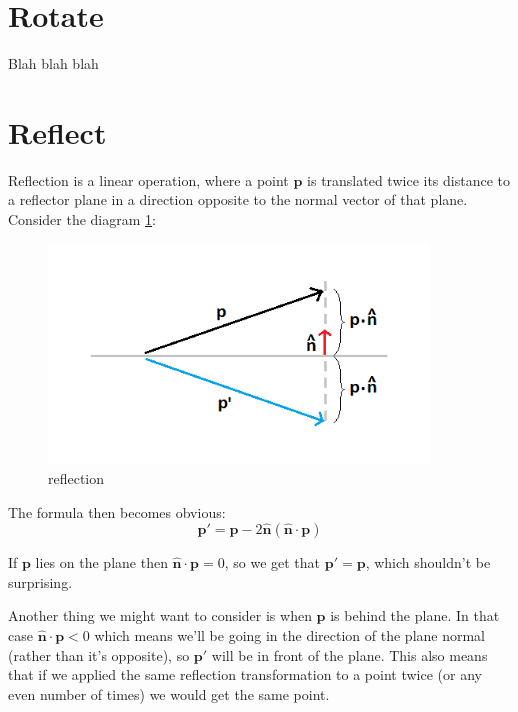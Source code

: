 \documentclass[]{report}   %
\begin{document}
\section{Rotate}

Blah blah blah


\section{Reflect}

Reflection is a linear operation, where a point \(\mathbf{p}\) is translated twice its distance to a reflector plane in a direction opposite to the normal vector of that plane. Consider the diagram \ref{fig:reflect}:

\begin{figure}[htb]
\centering
\includegraphics[width=0.9\textwidth]{reflection-diagram}
\caption{reflection}
\label{fig:reflect}
\end{figure}

The formula then becomes obvious:
\[
	\mathbf{p\prime} = 
	\mathbf{p} - 2\mathbf{\hat{n}}(\mathbf{\hat{n}} \cdot \mathbf{p})
\]

If \(\mathbf{p}\) lies on the plane then \(\mathbf{\hat{n}} \cdot \mathbf{p} = 0\), so we get that \(\mathbf{p\prime} = \mathbf{p}\), which shouldn't be surprising. 

Another thing we might want to consider is when \(\mathbf{p}\) is behind the plane. In that case \(\mathbf{\hat{n}} \cdot \mathbf{p} < 0\) which means we'll be going in the direction of the plane normal (rather than it's opposite), so \(\mathbf{p\prime}\) will be in front of the plane. This also means that if we applied the same reflection transformation to a point twice (or any even number of times) we would get the same point.
\end{document}
